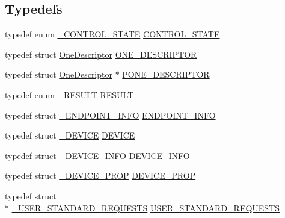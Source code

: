 \subsection*{Typedefs}
\begin{DoxyCompactItemize}
\item 
typedef enum \hyperlink{_s_t_m32_f10x_2_libraries_2_s_t_m32___u_s_b-_f_s-_device___driver_2inc_2usb__core_8h_a88c28862a896605c15eb3243cfae491f}{\-\_\-\-C\-O\-N\-T\-R\-O\-L\-\_\-\-S\-T\-A\-T\-E} \hyperlink{_s_t_m32_f30x_2_libraries_2_s_t_m32___u_s_b-_f_s-_device___driver_2inc_2usb__core_8h_a8d095984627f0ea2cb9b5140ff7341fc}{C\-O\-N\-T\-R\-O\-L\-\_\-\-S\-T\-A\-T\-E}
\item 
typedef struct \hyperlink{struct_one_descriptor}{One\-Descriptor} \hyperlink{_s_t_m32_f30x_2_libraries_2_s_t_m32___u_s_b-_f_s-_device___driver_2inc_2usb__core_8h_aecb1ac02fecb54620d01af4fccf4c51e}{O\-N\-E\-\_\-\-D\-E\-S\-C\-R\-I\-P\-T\-O\-R}
\item 
typedef struct \hyperlink{struct_one_descriptor}{One\-Descriptor} $\ast$ \hyperlink{_s_t_m32_f30x_2_libraries_2_s_t_m32___u_s_b-_f_s-_device___driver_2inc_2usb__core_8h_a0108bfe92b722a4cca7401e3b2491878}{P\-O\-N\-E\-\_\-\-D\-E\-S\-C\-R\-I\-P\-T\-O\-R}
\item 
typedef enum \hyperlink{_s_t_m32_f10x_2_libraries_2_s_t_m32___u_s_b-_f_s-_device___driver_2inc_2usb__core_8h_a4f5f2a92b77700a9807e498683faa407}{\-\_\-\-R\-E\-S\-U\-L\-T} \hyperlink{_s_t_m32_f30x_2_libraries_2_s_t_m32___u_s_b-_f_s-_device___driver_2inc_2usb__core_8h_ac0c5cc7751807fb0264baeab942bc8c3}{R\-E\-S\-U\-L\-T}
\item 
typedef struct \hyperlink{struct___e_n_d_p_o_i_n_t___i_n_f_o}{\-\_\-\-E\-N\-D\-P\-O\-I\-N\-T\-\_\-\-I\-N\-F\-O} \hyperlink{_s_t_m32_f30x_2_libraries_2_s_t_m32___u_s_b-_f_s-_device___driver_2inc_2usb__core_8h_a19ad46709b2d54f72c82ed0b9befdb99}{E\-N\-D\-P\-O\-I\-N\-T\-\_\-\-I\-N\-F\-O}
\item 
typedef struct \hyperlink{struct___d_e_v_i_c_e}{\-\_\-\-D\-E\-V\-I\-C\-E} \hyperlink{_s_t_m32_f30x_2_libraries_2_s_t_m32___u_s_b-_f_s-_device___driver_2inc_2usb__core_8h_a85594805bde95346bc3a19853317a89d}{D\-E\-V\-I\-C\-E}
\item 
typedef struct \hyperlink{struct___d_e_v_i_c_e___i_n_f_o}{\-\_\-\-D\-E\-V\-I\-C\-E\-\_\-\-I\-N\-F\-O} \hyperlink{_s_t_m32_f30x_2_libraries_2_s_t_m32___u_s_b-_f_s-_device___driver_2inc_2usb__core_8h_a6c959d0e0181f5f4b6a8b6b3f8e16760}{D\-E\-V\-I\-C\-E\-\_\-\-I\-N\-F\-O}
\item 
typedef struct \hyperlink{struct___d_e_v_i_c_e___p_r_o_p}{\-\_\-\-D\-E\-V\-I\-C\-E\-\_\-\-P\-R\-O\-P} \hyperlink{_s_t_m32_f30x_2_libraries_2_s_t_m32___u_s_b-_f_s-_device___driver_2inc_2usb__core_8h_a90353becd4185446508b796a7f39fbce}{D\-E\-V\-I\-C\-E\-\_\-\-P\-R\-O\-P}
\item 
typedef struct \\*
\hyperlink{struct___u_s_e_r___s_t_a_n_d_a_r_d___r_e_q_u_e_s_t_s}{\-\_\-\-U\-S\-E\-R\-\_\-\-S\-T\-A\-N\-D\-A\-R\-D\-\_\-\-R\-E\-Q\-U\-E\-S\-T\-S} \hyperlink{_s_t_m32_f30x_2_libraries_2_s_t_m32___u_s_b-_f_s-_device___driver_2inc_2usb__core_8h_abf9887b82ae511cfb155d0d97c9a7c1a}{U\-S\-E\-R\-\_\-\-S\-T\-A\-N\-D\-A\-R\-D\-\_\-\-R\-E\-Q\-U\-E\-S\-T\-S}
\end{DoxyCompactItemize}

